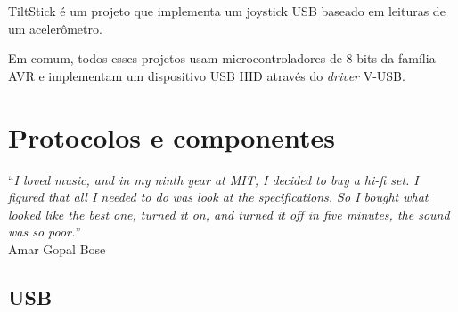 \documentclass[brazil,pagestart=firstchapter]{abnt}
\begin{document}
TiltStick \cite{TiltStick} é um projeto que implementa um joystick \acs{USB}
baseado em leituras de um acelerômetro.

Em comum, todos esses projetos usam microcontroladores de 8 bits da família
AVR e implementam um dispositivo \acs{USB} \acs{HID} através do
\textit{driver} V-USB.



%
%



\chapter{Protocolos e componentes}
\label{cap:protocolos_e_componentes}


\vfill{}
\begin{flushright}{}
``\emph{I loved music, and in my ninth year at MIT, I decided to buy a hi-fi
set. I figured that all I needed to do was look at the specifications. So I
bought what looked like the best one, turned it on, and turned it off in
five minutes, the sound was so poor.}''\\
{\small Amar Gopal Bose}
\end{flushright}{\small \par}
\vfill{}

\newpage


\section{USB}
\label{sec:usb}

\end{document}
